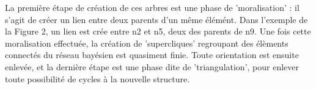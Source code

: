 \documentclass[a4paper]{article}
\begin{document}
\par \medbreak 
La première étape de création de ces arbres est une phase de 'moralisation' : il s'agit de créer un lien entre deux parents d'un même élémént. Dans l'exemple de la Figure 2, un lien est crée entre n2 et n5, 
deux des parents de n9. Une fois cette moralisation effectuée, la création de 'supercliques' regroupant des élèments connectés du réseau bayésien est quasiment finie. Toute orientation est ensuite enlevée, et la dernière
étape est une phase dite de 'triangulation', pour enlever toute possibilité de cycles à la nouvelle structure.
\end{document}
